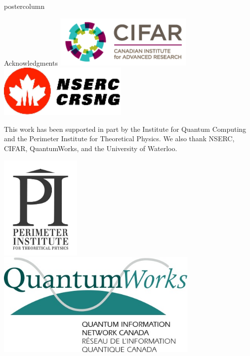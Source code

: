 \documentclass[final]{beamer} %
\begin{document}
\begin{frame}{}
\begin{columns}
\begin{column}{.33\textwidth}
\begin{beamercolorbox}[center,wd=\textwidth]{postercolumn}
\begin{minipage}[T]{.95\textwidth}
           \begin{block}{\large Acknowledgments}
             \centering 
             \includegraphics[height=1in]{figures/CIFAR_Logo.png} \ \ \includegraphics[height=1in]{figures/NSERC_Logo.png}

            This work has been supported in part by the Institute for Quantum Computing and the Perimeter Institute for Theoretical Physics. We also thank NSERC, CIFAR, QuantumWorks, and the University of Waterloo.

             \centering 
             \includegraphics[height=2in]{figures/PI_Logo.png} \ \ \includegraphics[height=2in]{figures/QuantumWorks_Logo.png}
           \end{block}

         \end{minipage}
      \end{beamercolorbox}
    \end{column}




  \end{columns}
  \end{frame}
\end{document}

